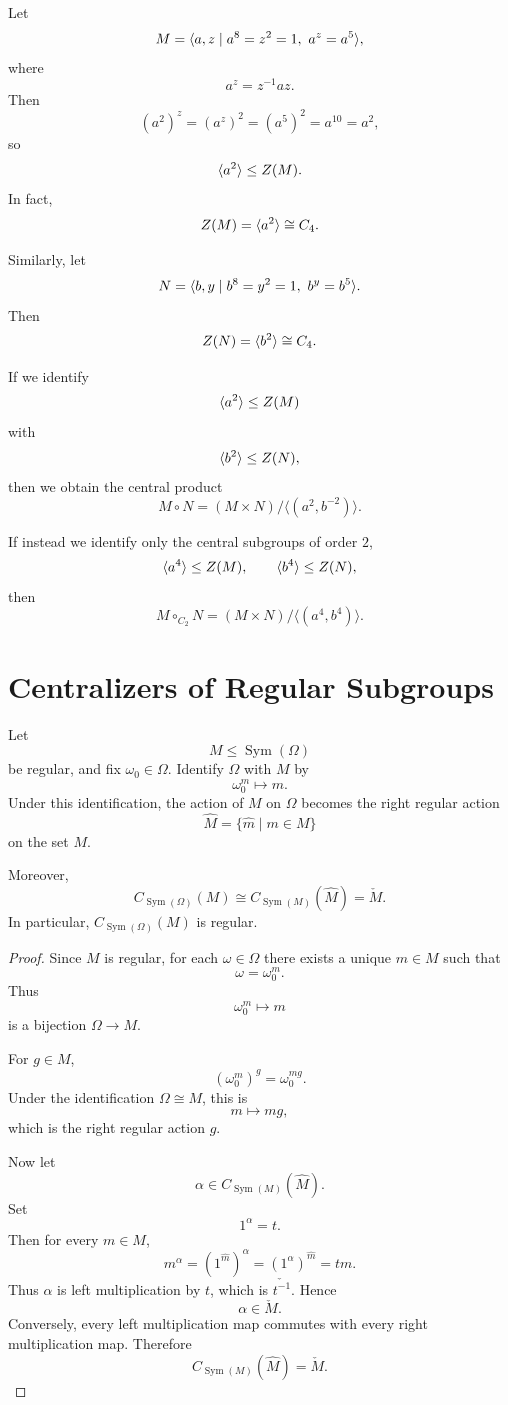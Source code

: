 \begin{example}
Let
\[
    M=\gen{a,z\mid a^8=z^2=1,\ a^z=a^5},
\]
where
\[
    a^z=z^{-1}az.
\]
Then
\[
    (a^2)^z=(a^z)^2=(a^5)^2=a^{10}=a^2,
\]
so
\[
    \langle a^2\rangle\leq Z(M).
\]
In fact,
\[
    Z(M)=\langle a^2\rangle\cong C_4.
\]

Similarly, let
\[
    N=\langle b,y\mid b^8=y^2=1,\ b^y=b^5\rangle.
\]
Then
\[
    Z(N)=\langle b^2\rangle\cong C_4.
\]

If we identify
\[
    \langle a^2\rangle\leq Z(M)
\]
with
\[
    \langle b^2\rangle\leq Z(N),
\]
then we obtain the central product
\[
    M\circ N
    =
    (M\times N)/\langle(a^2,b^{-2})\rangle.
\]

If instead we identify only the central subgroups of order \(2\),
\[
    \langle a^4\rangle\leq Z(M),
    \qquad
    \langle b^4\rangle\leq Z(N),
\]
then
\[
    M\circ_{C_2}N
    =
    (M\times N)/\langle(a^4,b^4)\rangle.
\]
\end{example}

\section{Centralizers of Regular Subgroups}

\begin{lemma}
Let
\[
    M\leq \operatorname{Sym}(\Omega)
\]
be regular, and fix \(\omega_0\in\Omega\). Identify \(\Omega\) with \(M\) by
\[
    \omega_0^m\longmapsto m.
\]
Under this identification, the action of \(M\) on \(\Omega\) becomes the right regular action
\[
    \widehat M=\{\widehat m\mid m\in M\}
\]
on the set \(M\).

Moreover,
\[
    C_{\operatorname{Sym}(\Omega)}(M)
    \cong
    C_{\operatorname{Sym}(M)}(\widehat M)
    =
    \check M.
\]
In particular, \(C_{\operatorname{Sym}(\Omega)}(M)\) is regular.
\end{lemma}

\begin{proof}
Since \(M\) is regular, for each \(\omega\in\Omega\) there exists a unique \(m\in M\) such that
\[
    \omega=\omega_0^m.
\]
Thus
\[
    \omega_0^m\longmapsto m
\]
is a bijection \(\Omega\to M\).

For \(g\in M\),
\[
    (\omega_0^m)^g=\omega_0^{mg}.
\]
Under the identification \(\Omega\cong M\), this is
\[
    m\longmapsto mg,
\]
which is the right regular action \(\widehat g\).

Now let
\[
    \alpha\in C_{\operatorname{Sym}(M)}(\widehat M).
\]
Set
\[
    1^\alpha=t.
\]
Then for every \(m\in M\),
\[
    m^\alpha
    =
    (1^{\widehat m})^\alpha
    =
    (1^\alpha)^{\widehat m}
    =
    tm.
\]
Thus \(\alpha\) is left multiplication by \(t\), which is \(\check{t^{-1}}\). Hence
\[
    \alpha\in \check M.
\]
Conversely, every left multiplication map commutes with every right multiplication map.
Therefore
\[
    C_{\operatorname{Sym}(M)}(\widehat M)=\check M.
\]
\end{proof}

